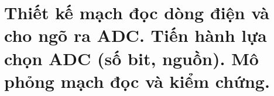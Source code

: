 \section{Thiết kế mạch đọc dòng điện và cho ngõ ra ADC. Tiến hành lựa chọn ADC (số bit, nguồn). Mô phỏng mạch đọc và kiểm chứng.}
